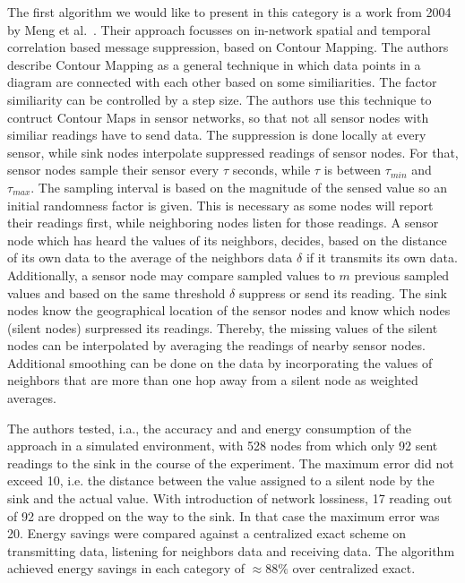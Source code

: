 \label{sec:Adaptive Filtering}

The first algorithm we would like to present in this category is a work from
2004 by Meng et al.~\cite{meng2004event}. Their approach focusses on in-network
spatial and temporal correlation based message suppression, based on Contour
Mapping. The authors describe Contour Mapping as a general technique in which
data points in a diagram are connected with each other based on some
similiarities. The factor similiarity can be controlled by a step size. The
authors use this technique to contruct Contour Maps in sensor networks, so that
not all sensor nodes with similiar readings have to send data. The suppression
is done locally at every sensor, while sink nodes interpolate suppressed
readings of sensor nodes. For that, sensor nodes sample their sensor every $
\tau $ seconds, while $ \tau $ is between $ \tau_{min} $ and $ \tau_{max} $.
The sampling interval is based on the magnitude of the sensed value so an
initial randomness factor is given. This is necessary as some nodes will report
their readings first, while neighboring nodes listen for those readings. A
sensor node which has heard the values of its neighbors, decides, based on the
distance of its own data to the average of the neighbors data $ \delta $ if it
transmits its own data. Additionally, a sensor node may compare sampled values
to $ m $ previous sampled values and based on the same threshold $ \delta $
suppress or send its reading. The sink nodes know the geographical location of
the sensor nodes and know which nodes (silent nodes) surpressed its readings.
Thereby, the missing values of the silent nodes can be interpolated by
averaging the readings of nearby sensor nodes. Additional smoothing can be done
on the data by incorporating the values of neighbors that are more than one hop
away from a silent node as weighted averages.

The authors tested, i.a., the accuracy and and energy consumption of the
approach in a simulated environment, with 528 nodes from which only 92 sent
readings to the sink in the course of the experiment. The maximum error did not
exceed 10, i.e. the distance between the value assigned to a silent node by the
sink and the actual value. With introduction of network lossiness, 17 reading
out of 92 are dropped on the way to the sink. In that case the maximum error
was 20. Energy savings were compared against a centralized exact scheme on
transmitting data, listening for neighbors data and receiving data. The
algorithm achieved energy savings in each category of $ \approx88\% $ over
centralized exact. 

